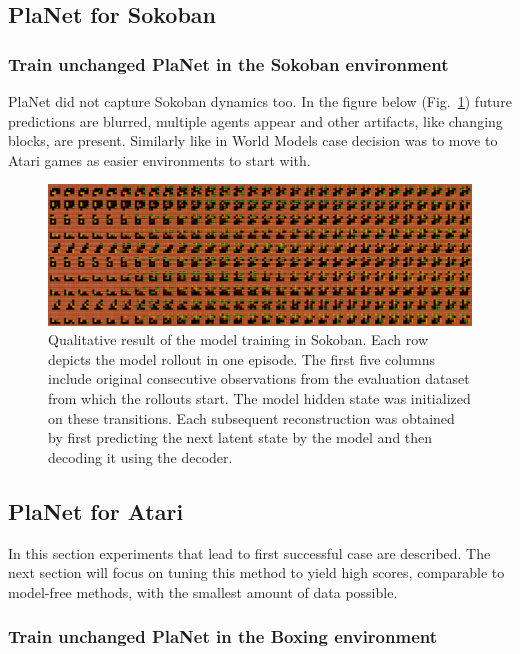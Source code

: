 \subsection{PlaNet for Sokoban}

\subsubsection{Train unchanged PlaNet in the Sokoban environment}

PlaNet did not capture Sokoban dynamics too. In the figure below (Fig.~\ref{Fig.PlaNet_Sokoban_openloop}) future predictions are blurred, multiple agents appear and other artifacts, like changing blocks, are present. Similarly like in World Models case decision was to move to Atari games as easier environments to start with.

\begin{figure}[H]
\includegraphics[width=1\textwidth,keepaspectratio]{figures/PlaNet/Sokoban_memory.png}
\caption[Qualitative result of the PlaNet model training in Sokoban]{Qualitative result of the model training in Sokoban. Each row depicts the model rollout in one episode. The first five columns include original consecutive observations from the evaluation dataset from which the rollouts start. The model hidden state was initialized on these transitions. Each subsequent reconstruction was obtained by first predicting the next latent state by the model and then decoding it using the decoder.}
\label{Fig.PlaNet_Sokoban_openloop}
\end{figure}

\subsection{PlaNet for Atari}

In this section experiments that lead to first successful case are described. The next section will focus on tuning this method to yield high scores, comparable to model-free methods, with the smallest amount of data possible.

\subsubsection{Train unchanged PlaNet in the Boxing environment}

